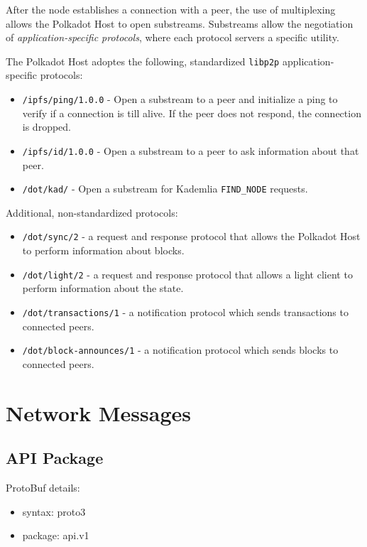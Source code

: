 \documentclass{book}
\begin{document}
After the node establishes a connection with a peer, the use of multiplexing
allows the Polkadot Host to open substreams. Substreams allow the negotiation of
\textit{application-specific protocols}, where each protocol servers a specific
utility.

The Polkadot Host adoptes the following, standardized \verb|libp2p|
application-specific protocols:

\begin{itemize}
    \item \verb|/ipfs/ping/1.0.0| - Open a substream to a peer and initialize a
    ping to verify if a connection is till alive. If the peer does not respond,
    the connection is dropped.
    \item \verb|/ipfs/id/1.0.0| - Open a substream to a peer to ask information
    about that peer.
    \item \verb|/dot/kad/| - Open a substream for Kademlia
    \verb|FIND_NODE| requests.
\end{itemize}

Additional, non-standardized protocols:

\begin{itemize}
    \item \verb|/dot/sync/2| - a request and response protocol that
    allows the Polkadot Host to perform information about blocks.
    \item \verb|/dot/light/2| - a request and response protocol that
    allows a light client to perform information about the state.
    \item \verb|/dot/transactions/1| - a notification protocol which
    sends transactions to connected peers.
    \item \verb|/dot/block-announces/1| - a notification protocol
    which sends blocks to connected peers.
\end{itemize}

\section{Network Messages}

\subsection{API Package}

ProtoBuf details:

\begin{itemize}
    \item syntax: proto3
    \item package: api.v1
\end{itemize}
\end{document}
